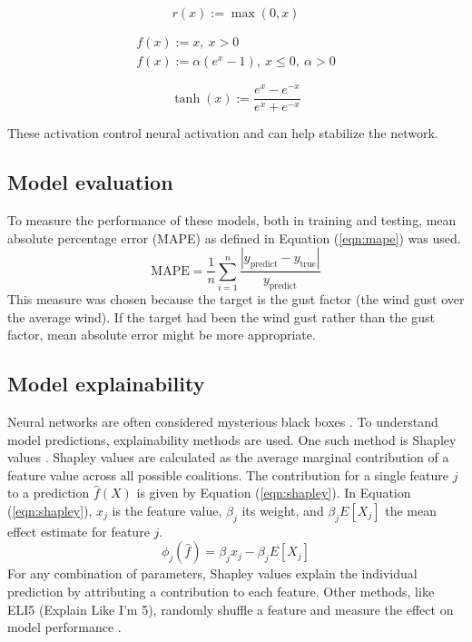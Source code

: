 \begin{equation}
    \label{eqn:relu}
    r(x):=\max(0, x)
\end{equation}

\begin{align}
    \label{eqn:elu}
    f(x) := x,\ x > 0\\
    f(x) := \alpha (e^x-1),\ x\leq 0,\ \alpha > 0
\end{align}

\begin{equation}
    \label{eqn:tanh}
    \operatorname{tanh}(x):=\frac{e^x-e^{-x}}{e^x+e^{-x}}
\end{equation}

These activation control neural activation and can help stabilize the network.
\subsection{Model evaluation}
To measure the performance of these models, both in training and testing, mean absolute percentage error (MAPE) as defined in Equation (\ref{eqn:mape}) was used.
\begin{equation}
    \label{eqn:mape}
    \text{MAPE} = \frac{1}{n}\sum_{i=1}^n\frac{|y_{\mathrm{predict}} - y_{\mathrm{true}}|}{y_{\mathrm{predict}}}
\end{equation}
This measure was chosen because the target is the gust factor (the wind gust over the average wind). If the target had been the wind gust rather than the gust factor, mean absolute error might be more appropriate.

\subsection{Model explainability}
Neural networks are often considered mysterious black boxes \cite{nn_black_box}. To understand model predictions, explainability methods are used. One such method is Shapley values \cite{shapley_information}. Shapley values are calculated as the average marginal contribution of a feature value across all possible coalitions. The contribution for a single feature \(j\) to a prediction \(\hat{f}(X)\) is given by Equation (\ref{eqn:shapley}). In Equation (\ref{eqn:shapley}), \(x_j\) is the feature value, \(\beta_j\) its weight, and \(\beta_j E[X_j]\) the mean effect estimate for feature \(j\).
\begin{equation}
    \label{eqn:shapley}
    \phi_j(\hat{f}) = \beta_j x_j - \beta_j E[X_j]
\end{equation}
For any combination of parameters, Shapley values explain the individual prediction by attributing a contribution to each feature. Other methods, like ELI5 (Explain Like I’m 5), randomly shuffle a feature and measure the effect on model performance \cite{eli5_information}.

